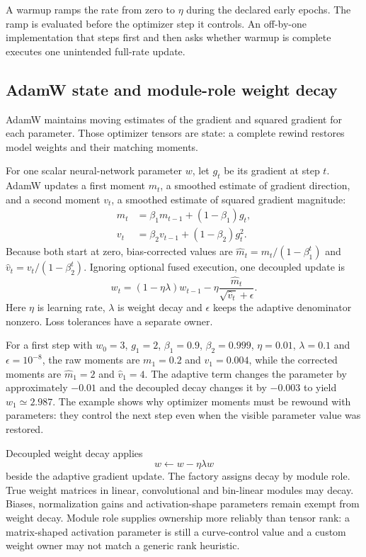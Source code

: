 \documentclass[10pt,aps,prd,twocolumn,nofootinbib]{revtex4-2}
\begin{document}
A warmup ramps the rate from zero to \(\eta\) during the declared early
epochs.  The ramp is evaluated before the optimizer step it controls.  An
off-by-one implementation that steps first and then asks whether warmup is
complete executes one unintended full-rate update.

\subsection{AdamW state and module-role weight decay}

AdamW maintains moving estimates of the gradient and squared gradient for each
parameter.  Those optimizer tensors are state: a complete rewind restores
model weights and their matching moments.

For one scalar neural-network parameter $w$, let $g_t$ be its gradient at step $t$.
AdamW updates a first moment $m_t$, a smoothed estimate of gradient direction,
and a second moment $v_t$, a smoothed estimate of squared gradient magnitude:
\begin{align*}
 m_t&=\beta_1m_{t-1}+(1-\beta_1)g_t,\\
 v_t&=\beta_2v_{t-1}+(1-\beta_2)g_t^2.
\end{align*}
Because both start at zero, bias-corrected values are
$\widehat m_t=m_t/(1-\beta_1^t)$ and
$\widehat v_t=v_t/(1-\beta_2^t)$.  Ignoring optional fused execution, one
decoupled update is
\begin{equation*}
 w_t=(1-\eta\lambda)w_{t-1}
 -\eta\frac{\widehat m_t}{\sqrt{\widehat v_t}+\epsilon}.
\end{equation*}
Here $\eta$ is learning rate, $\lambda$ is weight decay and $\epsilon$ keeps
the adaptive denominator nonzero.  Loss tolerances have a separate owner.

For a first step with $w_0=3$, $g_1=2$, $\beta_1=0.9$,
$\beta_2=0.999$, $\eta=0.01$, $\lambda=0.1$ and
$\epsilon=10^{-8}$, the raw moments are $m_1=0.2$ and $v_1=0.004$, while
the corrected moments are $\widehat m_1=2$ and $\widehat v_1=4$.
The adaptive term changes the parameter by approximately $-0.01$ and the
decoupled decay changes it by $-0.003$ to yield $w_1\simeq2.987$.
The example shows why optimizer moments must be rewound with parameters: they
control the next step even when the visible parameter value was restored.

Decoupled weight decay applies
\begin{equation*}
  w\leftarrow w-\eta\lambda w
\end{equation*}
beside the adaptive gradient update.  The factory assigns decay by module
role.  True weight matrices in linear, convolutional and bin-linear modules
may decay.  Biases, normalization gains and activation-shape parameters remain
exempt from weight decay.  Module role supplies ownership more reliably than tensor rank: a matrix-shaped
activation parameter is still a curve-control value and a custom weight
owner may not match a generic rank heuristic.
\end{document}
